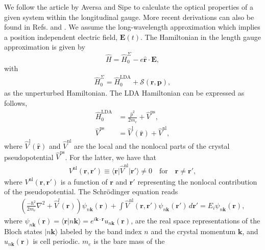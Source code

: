 We follow the article by Aversa and Sipe \cite{aversaPRB95} to calculate the
optical properties of a given system within the longitudinal gauge. More recent
derivations can also be found in Refs. \cite{sipePRB00} and
\cite{lambrechtPSSB00}. We assume the long-wavelength approximation which implies
a position independent electric field, $\mathbf{E}(t)$. The Hamiltonian in the
length gauge approximation is given by
\begin{equation}\label{ache}
\hat{H}=\hat{H}^{\Sigma}_{0} - e\hat{\mathbf{r}}\cdot\mathbf{E},
\end{equation}
with
\begin{align}\label{ache.1}
  \hat{H}^{\Sigma}_{0} = \hat{H}^{\mathrm{LDA}}_{0}
+ \mathcal{S}(\mathbf{r},\mathbf{p}),
\end{align} 
as the unperturbed Hamiltonian. The LDA Hamiltonian can be expressed as follows,
\begin{align}\label{ache.2}
\hat{H}^{\mathrm{LDA}}_{0}
&= \frac{\hat{p}^{2}}{2m_{e}} + \hat{V}^{\mathrm{ps}},\nonumber\\
\hat{V}^{\mathrm{ps}}
&= \hat{V}^{\mathrm{l}}(\hat{\mathbf{r}}) + \hat{V}^{\mathrm{nl}},
\end{align}  
where $\hat{V}^{\mathrm{l}}(\hat{\mathbf{r}})$ and $\hat{V}^{\mathrm{nl}}$ are
the local and the nonlocal parts of the crystal pseudopotential
$\hat{V}^{\mathrm{ps}}$. For the latter, we have that
\begin{align}\label{ache.3n}
V^{\mathrm{nl}}(\mathbf{r},\mathbf{r}')\equiv
\langle\mathbf{r}\vert
\hat{V}^{\mathrm{nl}}
\vert\mathbf{r}'\rangle \neq 0 
\quad\text{for}\quad\mathbf{r} \neq \mathbf{r}',
\end{align}
where $V^{\mathrm{nl}}(\mathbf{r},\mathbf{r}')$ is a function of $\mathbf{r}$
and $\mathbf{r}'$ representing the nonlocal contribution of the pseudopotential.
The Schr\"odinger equation reads
\begin{align}\label{ache.4} 
\left(
\frac{-\hbar^2}{2m_{e}}\nabla^{2}
+ \hat{V}^l(\mathbf{r})
\right)
\psi_{n\mathbf{k}}(\mathbf{r})
+ \int\hat{V}^{\mathrm{nl}}(\mathbf{r},\mathbf{r}')
  \psi_{n\mathbf{k}}(\mathbf{r}')\,d\mathbf{r}'
= E_{i}\psi_{n\mathbf{k}}(\mathbf{r}),
\end{align} 
where $\psi_{n\mathbf{k}}(\mathbf{r}) = \langle\mathbf{r}|n\mathbf{k}\rangle =
e^{i\mathbf{k}\cdot\mathbf{r}}u_{n\mathbf{k}}(\mathbf{r})$, are the real space
representations of the Bloch states $|n\mathbf{k}\rangle$ labeled by the band
index $n$ and the crystal momentum $\mathbf{k}$, and
$u_{n\mathbf{k}}(\mathbf{r})$ is cell periodic. $m_{e}$ is the bare mass of the
